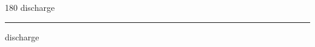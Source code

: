 
\begin{frame}
\begin{center}
\begin{turn}{180}
{\fontsize{2.5cm}{1em}\selectfont discharge}
\end{turn}
\vspace{1em}\par  
\hrule
\vspace{1em}\par  
{\fontsize{2.5cm}{1em}\selectfont discharge}
\end{center}
\end{frame}
